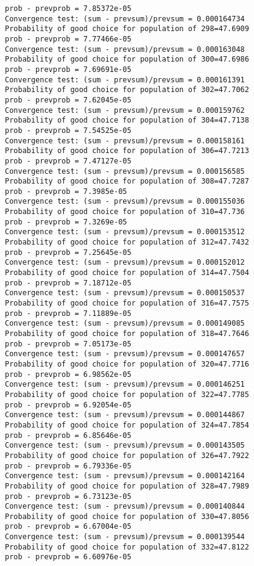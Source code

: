 \documentclass[11pt,onecolumn]{article}
\begin{document}
\begin{verbatim}
prob - prevprob = 7.85372e-05
Convergence test: (sum - prevsum)/prevsum = 0.000164734
Probability of good choice for population of 298=47.6909
prob - prevprob = 7.77466e-05
Convergence test: (sum - prevsum)/prevsum = 0.000163048
Probability of good choice for population of 300=47.6986
prob - prevprob = 7.69691e-05
Convergence test: (sum - prevsum)/prevsum = 0.000161391
Probability of good choice for population of 302=47.7062
prob - prevprob = 7.62045e-05
Convergence test: (sum - prevsum)/prevsum = 0.000159762
Probability of good choice for population of 304=47.7138
prob - prevprob = 7.54525e-05
Convergence test: (sum - prevsum)/prevsum = 0.000158161
Probability of good choice for population of 306=47.7213
prob - prevprob = 7.47127e-05
Convergence test: (sum - prevsum)/prevsum = 0.000156585
Probability of good choice for population of 308=47.7287
prob - prevprob = 7.3985e-05
Convergence test: (sum - prevsum)/prevsum = 0.000155036
Probability of good choice for population of 310=47.736
prob - prevprob = 7.3269e-05
Convergence test: (sum - prevsum)/prevsum = 0.000153512
Probability of good choice for population of 312=47.7432
prob - prevprob = 7.25645e-05
Convergence test: (sum - prevsum)/prevsum = 0.000152012
Probability of good choice for population of 314=47.7504
prob - prevprob = 7.18712e-05
Convergence test: (sum - prevsum)/prevsum = 0.000150537
Probability of good choice for population of 316=47.7575
prob - prevprob = 7.11889e-05
Convergence test: (sum - prevsum)/prevsum = 0.000149085
Probability of good choice for population of 318=47.7646
prob - prevprob = 7.05173e-05
Convergence test: (sum - prevsum)/prevsum = 0.000147657
Probability of good choice for population of 320=47.7716
prob - prevprob = 6.98562e-05
Convergence test: (sum - prevsum)/prevsum = 0.000146251
Probability of good choice for population of 322=47.7785
prob - prevprob = 6.92054e-05
Convergence test: (sum - prevsum)/prevsum = 0.000144867
Probability of good choice for population of 324=47.7854
prob - prevprob = 6.85646e-05
Convergence test: (sum - prevsum)/prevsum = 0.000143505
Probability of good choice for population of 326=47.7922
prob - prevprob = 6.79336e-05
Convergence test: (sum - prevsum)/prevsum = 0.000142164
Probability of good choice for population of 328=47.7989
prob - prevprob = 6.73123e-05
Convergence test: (sum - prevsum)/prevsum = 0.000140844
Probability of good choice for population of 330=47.8056
prob - prevprob = 6.67004e-05
Convergence test: (sum - prevsum)/prevsum = 0.000139544
Probability of good choice for population of 332=47.8122
prob - prevprob = 6.60976e-05

\end{verbatim}
\end{document}
